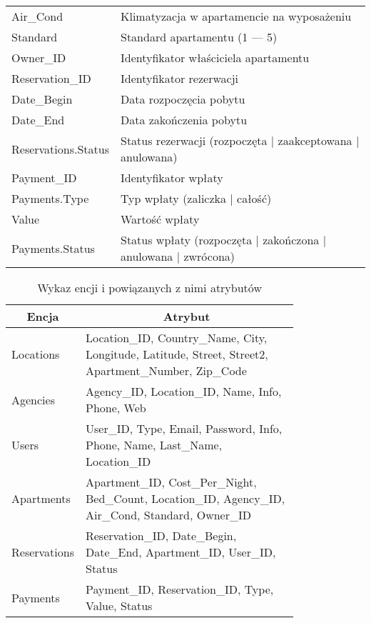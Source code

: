 \documentclass[polish, 11pt]{article}
\begin{document}
\begin{table}[H]
\begin{tabular}{ll}
                    Air\_Cond	&	Klimatyzacja w apartamencie na wyposażeniu	\\
                    Standard	&	Standard apartamentu (1 --- 5)	\\
                    Owner\_ID	&	Identyfikator właściciela apartamentu	\\
                    Reservation\_ID	&	Identyfikator rezerwacji	\\
                    Date\_Begin	&	Data rozpoczęcia pobytu	\\
                    Date\_End	&	Data zakończenia pobytu	\\
                    Reservations.Status	&	Status rezerwacji (rozpoczęta | zaakceptowana | anulowana)	\\
                    Payment\_ID	&	Identyfikator wpłaty	\\
                    Payments.Type	&	Typ wpłaty (zaliczka | całość)	\\
                    Value	&	Wartość wpłaty	\\
                    Payments.Status	&	Status wpłaty (rozpoczęta | zakończona | anulowana | zwrócona)	\\
                \bottomrule
                \end{tabular}
            \end{table}

            \begin{table}[H]
                \centering
                \caption{Wykaz encji i powiązanych z nimi atrybutów}\label{tab:entitiesAttributes}
                \begin{tabular}{lp{0.8\linewidth}}\toprule
                    \multicolumn{1}{c}{Encja}	&	\multicolumn{1}{c}{Atrybut}	\\\midrule
                    Locations	    &	Location\_ID, Country\_Name, City, Longitude, Latitude, Street, Street2, Apartment\_Number, Zip\_Code	\\
                    Agencies	    &	Agency\_ID, Location\_ID, Name, Info, Phone, Web	\\
                    Users	        &	User\_ID, Type, Email, Password, Info, Phone, Name, Last\_Name, Location\_ID	\\
                    Apartments	    &	Apartment\_ID, Cost\_Per\_Night, Bed\_Count, Location\_ID, Agency\_ID, Air\_Cond, Standard, Owner\_ID	\\
                    Reservations	&	Reservation\_ID, Date\_Begin, Date\_End, Apartment\_ID, User\_ID, Status	\\
                    Payments    	&	Payment\_ID, Reservation\_ID, Type, Value, Status	\\
                \bottomrule
                \end{tabular}
            \end{table}
\end{document}
